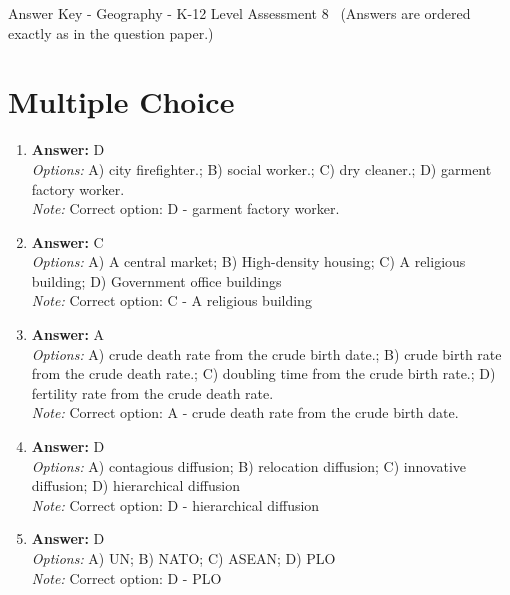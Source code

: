 \documentclass[12pt]{article}
\begin{document}
\begin{center}
Answer Key - Geography - K-12 Level Assessment 8 \
\small (Answers are ordered exactly as in the question paper.)
\end{center}

\section*{Multiple Choice}
\begin{enumerate}[label=\arabic*.]
\item \textbf{Answer:} D
\\ \textit{Options:} A) city firefighter.; B) social worker.; C) dry cleaner.; D) garment factory worker.
\\ \textit{Note:} Correct option: D - garment factory worker.
\item \textbf{Answer:} C
\\ \textit{Options:} A) A central market; B) High-density housing; C) A religious building; D) Government office buildings
\\ \textit{Note:} Correct option: C - A religious building
\item \textbf{Answer:} A
\\ \textit{Options:} A) crude death rate from the crude birth date.; B) crude birth rate from the crude death rate.; C) doubling time from the crude birth rate.; D) fertility rate from the crude death rate.
\\ \textit{Note:} Correct option: A - crude death rate from the crude birth date.
\item \textbf{Answer:} D
\\ \textit{Options:} A) contagious diffusion; B) relocation diffusion; C) innovative diffusion; D) hierarchical diffusion
\\ \textit{Note:} Correct option: D - hierarchical diffusion
\item \textbf{Answer:} D
\\ \textit{Options:} A) UN; B) NATO; C) ASEAN; D) PLO
\\ \textit{Note:} Correct option: D - PLO
\end{enumerate}
\end{document}
